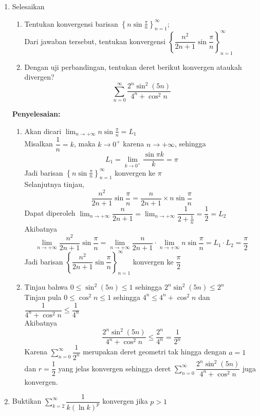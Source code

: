 \documentclass{article}
\begin{document}
\begin{enumerate}
	\item Selesaikan 
	\begin{enumerate}
		\item Tentukan konvergensi barisan $\left\{ n\sin\frac{\pi}{n}\right\}^\infty_{n=1}$;\\
		Dari jawaban tersebut, tentukan konvergensi $\left\{ \dfrac{n^2}{2n+1}\sin\dfrac{\pi}{n}\right\}^\infty_{n=1}$
		\item Dengan uji perbandingan, tentukan deret berikut konvergen ataukah divergen?
		$$ \sum_{n=0}^\infty \dfrac{2^n\sin^2(5n)}{4^n+\cos^2 n} $$
	\end{enumerate}
	\textbf{Penyelesaian:}
	\begin{enumerate}
		\item Akan dicari $\displaystyle \lim_{n\rightarrow +\infty} n\sin \frac{\pi}{n}=L_1$\\ Misalkan $\dfrac{1}{n}=k$, maka $k\rightarrow 0^+$ karena $n\rightarrow +\infty$, sehingga
		$$ L_1=\lim_{k\rightarrow 0^+} \dfrac{\sin \pi k}{k} = \pi $$ 
		Jadi barisan $\left\{ n\sin\frac{\pi}{n}\right\}^\infty_{n=1}$ konvergen ke $\pi$\\
		Selanjutnya tinjau, 
		$$ \dfrac{n^2}{2n+1}\sin \frac{\pi}{n}=\dfrac{n}{2n+1}\times n\sin\frac{\pi}{n}$$ 
		Dapat diperoleh $\displaystyle \lim_{n\rightarrow +\infty} \dfrac{n}{2n+1}=\lim_{n\rightarrow +\infty} \dfrac{1}{2+\frac{1}{n}}=\dfrac{1}{2}= L_2$\\
		Akibatnya $$ \lim_{n\rightarrow +\infty} \dfrac{n^2}{2n+1}\sin \frac{\pi}{n} = \lim_{n\rightarrow +\infty} \dfrac{n}{2n+1}\cdot \lim_{n\rightarrow +\infty} n\sin \frac{\pi}{n} = L_1\cdot L_2=\dfrac{\pi}{2} $$
		Jadi barisan $\left\{ \dfrac{n^2}{2n+1}\sin\dfrac{\pi}{n}\right\}^\infty_{n=1}$ konvergen ke $\dfrac{\pi}{2}$
		\item Tinjau bahwa $0\leq \sin^2(5n)\leq 1$ sehingga $2^n\sin^2(5n)\leq 2^n$\\
		Tinjau pula $0\leq \cos^2 n\leq 1$ sehingga $4^n\leq 4^n+\cos^2 n$ dan $\dfrac{1}{4^n+\cos^2 n}\leq \dfrac{1}{4^n}$\\
		Akibatnya 
		$$ \dfrac{2^n\sin^2(5n)}{4^n+\cos^2 n} \leq \dfrac{2^n}{4^n} = \dfrac{1}{2^n} $$
		Karena $\displaystyle \sum_{n=0}^\infty \dfrac{1}{2^n}$ merupakan deret geometri tak hingga dengan $a=1$ dan $r=\dfrac{1}{2}$ yang jelas konvergen sehingga deret $\displaystyle \sum_{n=0}^\infty \dfrac{2^n\sin^2(5n)}{4^n+\cos^2 n}$ juga konvergen.
	\end{enumerate}
	\item Buktikan $\displaystyle \sum_{k=2}^\infty \dfrac{1}{k(\ln k)^p}$ konvergen jika $p>1$\\

\end{enumerate}
\end{document}
